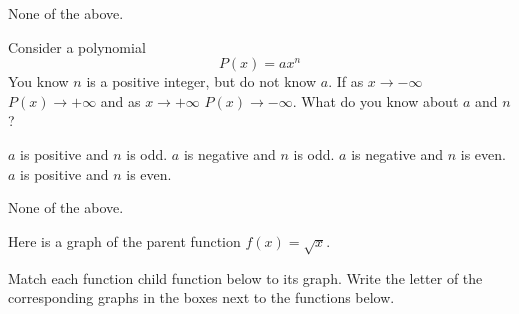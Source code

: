 \documentclass[addpoints,12pt]{exam}
\begin{document}
\begin{questions}
\begin{checkboxes}
    \choice None of the above.
\end{checkboxes}

\question[3] Consider a polynomial
\[P(x) = ax^n\]
You know $n$ is a positive integer, but do not know $a$. If as $x\to-\infty$ $P(x)\to+\infty$ and as $x\to+\infty$ $P(x)\to-\infty$. What do you know about $a$ and $n$?
\begin{checkboxes}
    \choice $a$ is positive and $n$ is odd.
    \choice $a$ is negative and $n$ is odd.
        \choice $a$ is negative and $n$ is even.
    \choice $a$ is positive and $n$ is even.

    \choice None of the above.
\end{checkboxes}

\newpage
\question[4] Here is a graph of the parent function $f(x)= \sqrt{x}$.
        \begin{center}
        \end{center}

Match each function child function below to its graph. Write the letter of the corresponding graphs in the boxes next to the functions below.


\end{questions}
\end{document}
